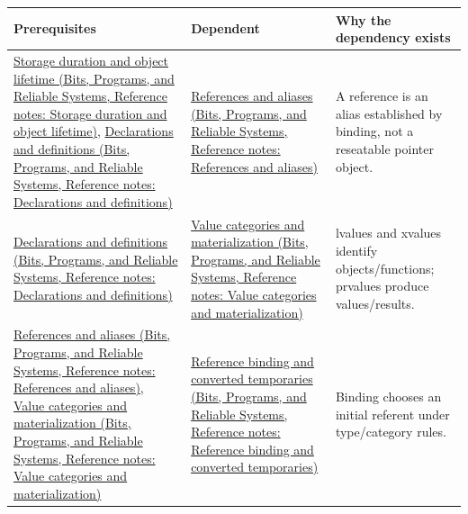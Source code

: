 {\def\LTcaptype{none} %
\begin{longtable}[]{@{}
  >{\raggedright\arraybackslash}p{}
  >{\raggedright\arraybackslash}p{}
  >{\raggedright\arraybackslash}p{}@{}}
\toprule\noalign{}
\begin{minipage}[b]{\linewidth}\raggedright
Prerequisites
\end{minipage} & \begin{minipage}[b]{\linewidth}\raggedright
Dependent
\end{minipage} & \begin{minipage}[b]{\linewidth}\raggedright
Why the dependency exists
\end{minipage} \\
\midrule\noalign{}
\endhead
\bottomrule\noalign{}
\endlastfoot
\href{../01-Bits-Programs-and-Reliable-Systems/main.pdf\#nameddest=appendix-0b104bcba06b}{Storage duration and object lifetime (Bits, Programs, and Reliable Systems, Reference notes: Storage duration and object lifetime)}, \href{../01-Bits-Programs-and-Reliable-Systems/main.pdf\#nameddest=appendix-2e4d494c2d94}{Declarations and definitions (Bits, Programs, and Reliable Systems, Reference notes: Declarations and definitions)} & \href{../01-Bits-Programs-and-Reliable-Systems/main.pdf\#nameddest=appendix-d6d562ca9fbb}{References and aliases (Bits, Programs, and Reliable Systems, Reference notes: References and aliases)} & A reference is an alias established by binding, not a reseatable pointer object. \\
\href{../01-Bits-Programs-and-Reliable-Systems/main.pdf\#nameddest=appendix-2e4d494c2d94}{Declarations and definitions (Bits, Programs, and Reliable Systems, Reference notes: Declarations and definitions)} & \href{../01-Bits-Programs-and-Reliable-Systems/main.pdf\#nameddest=appendix-1121b30eaeb0}{Value categories and materialization (Bits, Programs, and Reliable Systems, Reference notes: Value categories and materialization)} & lvalues and xvalues identify objects/functions; prvalues produce values/results. \\
\href{../01-Bits-Programs-and-Reliable-Systems/main.pdf\#nameddest=appendix-d6d562ca9fbb}{References and aliases (Bits, Programs, and Reliable Systems, Reference notes: References and aliases)}, \href{../01-Bits-Programs-and-Reliable-Systems/main.pdf\#nameddest=appendix-1121b30eaeb0}{Value categories and materialization (Bits, Programs, and Reliable Systems, Reference notes: Value categories and materialization)} & \href{../01-Bits-Programs-and-Reliable-Systems/main.pdf\#nameddest=appendix-37856d997bb0}{Reference binding and converted temporaries (Bits, Programs, and Reliable Systems, Reference notes: Reference binding and converted temporaries)} & Binding chooses an initial referent under type/category rules. \\

\end{longtable}}
